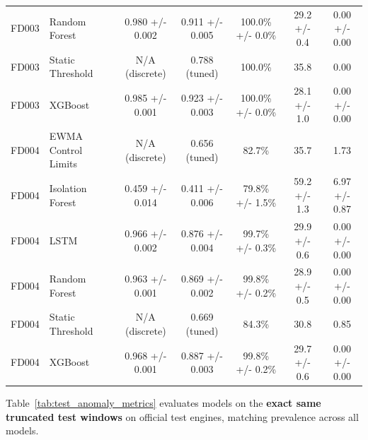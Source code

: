 \begin{table}[t!]
\begin{tabular}{llccccc}
FD003 & Random Forest & 0.980 +/- 0.002 & 0.911 +/- 0.005 & 100.0\% +/- 0.0\% & 29.2 +/- 0.4 & 0.00 +/- 0.00 \\
FD003 & Static Threshold & N/A (discrete) & 0.788 (tuned) & 100.0\% & 35.8 & 0.00 \\
FD003 & XGBoost & 0.985 +/- 0.001 & 0.923 +/- 0.003 & 100.0\% +/- 0.0\% & 28.1 +/- 1.0 & 0.00 +/- 0.00 \\
\midrule
FD004 & EWMA Control Limits & N/A (discrete) & 0.656 (tuned) & 82.7\% & 35.7 & 1.73 \\
FD004 & Isolation Forest & 0.459 +/- 0.014 & 0.411 +/- 0.006 & 79.8\% +/- 1.5\% & 59.2 +/- 1.3 & 6.97 +/- 0.87 \\
FD004 & LSTM & 0.966 +/- 0.002 & 0.876 +/- 0.004 & 99.7\% +/- 0.3\% & 29.9 +/- 0.6 & 0.00 +/- 0.00 \\
FD004 & Random Forest & 0.963 +/- 0.001 & 0.869 +/- 0.002 & 99.8\% +/- 0.2\% & 28.9 +/- 0.5 & 0.00 +/- 0.00 \\
FD004 & Static Threshold & N/A (discrete) & 0.669 (tuned) & 84.3\% & 30.8 & 0.85 \\
FD004 & XGBoost & 0.968 +/- 0.001 & 0.887 +/- 0.003 & 99.8\% +/- 0.2\% & 29.7 +/- 0.6 & 0.00 +/- 0.00 \\
\bottomrule
\end{tabular}
\end{table}

Table~\ref{tab:test_anomaly_metrics} evaluates models on the \textbf{exact same truncated test windows} on official test engines, matching prevalence across all models.

